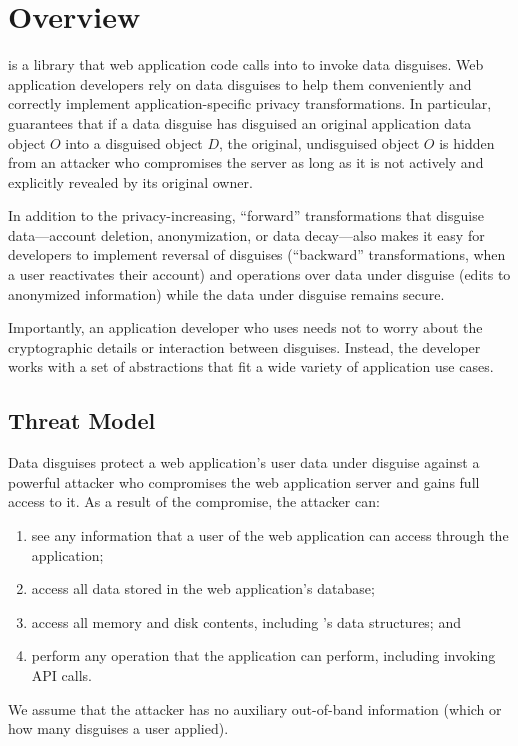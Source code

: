 \section{\sys Overview}
\label{s:overview}

%
\sys is a library that web application code calls into to invoke data disguises.
%
Web application developers rely on data disguises to help them conveniently and
correctly implement application-specific privacy transformations.
%
In particular, \sys guarantees that if a data disguise has disguised an original
application data object $O$ into a disguised object $D$, the original, undisguised
object $O$ is hidden from an attacker who compromises the server as long as it is
not actively and explicitly revealed by its original owner.
%

%
In addition to the privacy-increasing, ``forward'' transformations that disguise
data---\eg account deletion, anonymization, or data decay---\sys also makes it easy for
developers to implement reversal of disguises (``backward'' transformations, \eg when a
user reactivates their account) and operations over data under disguise (\eg edits to
anonymized information) while the data under disguise remains secure.
%

%
Importantly, an application developer who uses \sys needs not to worry about the
cryptographic details or interaction between disguises.
%
Instead, the developer works with a set of abstractions that fit a wide
variety of application use cases.
%

\subsection{Threat Model}
\label{s:threat}

%
Data disguises protect a web application's user data under disguise against a
powerful attacker who compromises the web application server and gains full
access to it.
%
As a result of the compromise, the attacker can:
\begin{enumerate}[nosep]
 \item see any information that a user of the web application can access through
   the application;
  \item access all data stored in the web application's database;
  \item access all memory and disk contents, including \sys's data structures; and
  \item perform any operation that the application can perform, including invoking
    \sys API calls.
\end{enumerate}
%
We assume that the attacker has no auxiliary out-of-band information (\eg which or
how many disguises a user applied).
%


